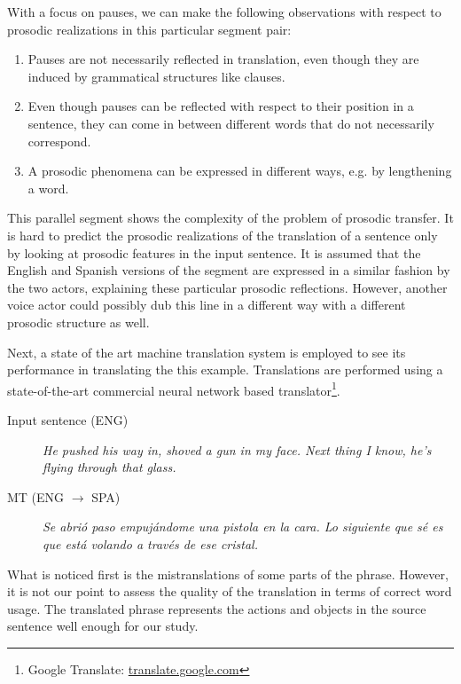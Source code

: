 With a focus on pauses, we can make the following observations with respect to prosodic realizations in this particular segment pair:
\begin{enumerate}
    \item Pauses are not necessarily reflected in translation, even though they are induced by grammatical structures like clauses.
    \item Even though pauses can be reflected with respect to their position in a sentence, they can come in between different words that do not necessarily correspond. 
    \item A prosodic phenomena can be expressed in different ways, e.g. by lengthening a word. 
\end{enumerate}

This parallel segment shows the complexity of the problem of prosodic transfer. It is hard to predict the prosodic realizations of the translation of a sentence only by looking at prosodic features in the input sentence. It is assumed that the English and Spanish versions of the segment are expressed in a similar fashion by the two actors, explaining these particular prosodic reflections. However, another voice actor could possibly dub this line in a different way with a different prosodic structure as well.  

Next, a state of the art machine translation system is employed to see its performance in translating the this example. Translations are performed using a state-of-the-art commercial neural network based translator\footnote{Google Translate: \url{translate.google.com}}.  

\begin{description}
\item [Input sentence (ENG)] {\it He pushed his way in, shoved a gun in my face. Next thing I know, he's flying through that glass.}
\item [MT (ENG $\rightarrow$ SPA)] {\it Se abrió paso empujándome una pistola en la cara. Lo siguiente que sé es que está volando a través de ese cristal.}
\end{description}

What is noticed first is the mistranslations of some parts of the phrase. However, it is not our point to assess the quality of the translation in terms of correct word usage. The translated phrase represents the actions and objects in the source sentence well enough for our study. 

